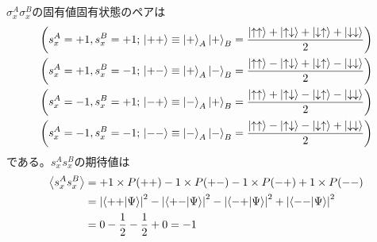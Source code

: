 \documentclass[../../sp_2019.tex]{subfiles}
\begin{document}
\subsection{}
\(\sigma_x^A\sigma_x^B\)の固有値固有状態のペアは
\begin{equation}\begin{aligned}[b]
    &\qty(s_x^A = +1,s_x^B = +1;\,\ket{++} \equiv \ket{+}_A\ket{+}_B=\frac{\ket{\uparrow\uparrow}+\ket{\uparrow\downarrow}+\ket{\downarrow\uparrow}+\ket{\downarrow\downarrow}}{2})\\
    &\qty(s_x^A = +1,s_x^B = -1;\,\ket{+-} \equiv \ket{+}_A\ket{-}_B=\frac{\ket{\uparrow\uparrow}-\ket{\uparrow\downarrow}+\ket{\downarrow\uparrow}-\ket{\downarrow\downarrow}}{2})\\
    &\qty(s_x^A = -1,s_x^B = +1;\,\ket{-+} \equiv \ket{-}_A\ket{+}_B=\frac{\ket{\uparrow\uparrow}+\ket{\uparrow\downarrow}-\ket{\downarrow\uparrow}-\ket{\downarrow\downarrow}}{2})\\
    &\qty(s_x^A = -1,s_x^B = -1;\,\ket{--} \equiv \ket{-}_A\ket{-}_B=\frac{\ket{\uparrow\uparrow}-\ket{\uparrow\downarrow}-\ket{\downarrow\uparrow}+\ket{\downarrow\downarrow}}{2})
\end{aligned}\end{equation}
である。\(s_x^As_x^B\)の期待値は
\begin{equation}\begin{aligned}[b]
    \ev{s_x^As_x^B}
    &= +1\times P(++) -1\times P(+-)
        -1\times P(-+) +1\times P(--)\\
    &= \abs{\braket{++}{\Psi}}^2 -\abs{\braket{+-}{\Psi}}^2
        -\abs{\braket{-+}{\Psi}}^2+\abs{\braket{--}{\Psi}}^2\\
    &= 0 -\frac{1}{2} -\frac{1}{2} +0 = -1
\end{aligned}\end{equation}
\end{document}
